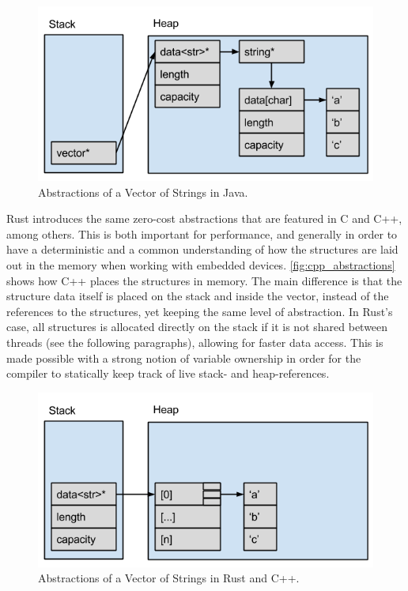 \begin{figure}[tb]
  \begin{center}
    \includegraphics[scale=0.5]{figures/java_abstractions}
  \end{center}
  \caption{Abstractions of a Vector of Strings in Java.}
  \label{fig:java_abstractions}
\end{figure}

Rust introduces the same zero-cost abstractions that are featured in C and C++, among others.
This is both important for performance, and generally in order to have a deterministic and a common understanding of how the structures are laid out in the memory when working with embedded devices.
\autoref{fig:cpp_abstractions} shows how C++ places the structures in memory.
The main difference is that the structure data itself is placed on the stack and inside the vector, instead of the references to the structures, yet keeping the same level of abstraction.
In Rust's case, all structures is allocated directly on the stack if it is not shared between threads (see the following paragraphs), allowing for faster data access.
This is made possible with a strong notion of variable ownership in order for the compiler to statically keep track of live stack- and heap-references.

\begin{figure}[tb]
  \begin{center}
    \includegraphics[scale=0.5]{figures/cpp_abstractions}
  \end{center}
  \caption{Abstractions of a Vector of Strings in Rust and C++.}
  \label{fig:cpp_abstractions}
\end{figure}

